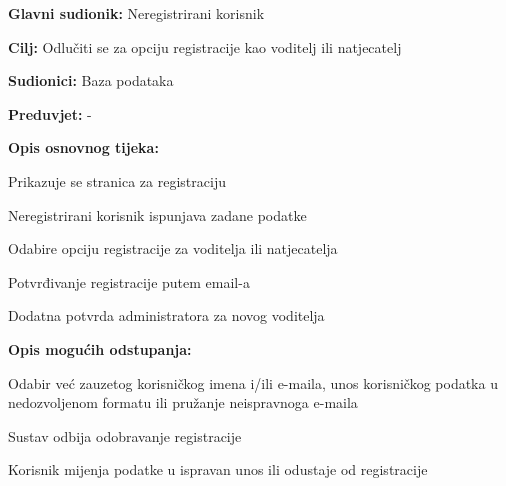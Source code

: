 					\noindent {}
					\begin{packed_item}
						
						\item \textbf{Glavni sudionik: }Neregistrirani korisnik
						\item  \textbf{Cilj:} Odlučiti se za opciju registracije kao voditelj ili natjecatelj 
						\item  \textbf{Sudionici:} Baza podataka
						\item  \textbf{Preduvjet:} -
						\item  \textbf{Opis osnovnog tijeka:}
						
						\item[] \begin{packed_enum}
							
							\item Prikazuje se stranica za registraciju
							\item Neregistrirani korisnik ispunjava zadane podatke
							\item Odabire opciju registracije za voditelja ili natjecatelja
							\item Potvrđivanje registracije putem email-a
							\item Dodatna potvrda administratora za novog voditelja
							
						\end{packed_enum}
						
						\item  \textbf{Opis mogućih odstupanja:}
						
						\item[] \begin{packed_item}
							
							\item[2.a] Odabir već zauzetog korisničkog imena i/ili e-maila, unos korisničkog podatka u nedozvoljenom formatu ili pružanje neispravnoga e-maila
							\item[] \begin{packed_enum}
								
								\item Sustav odbija odobravanje registracije
								\item Korisnik mijenja podatke u ispravan unos ili odustaje od registracije 
								
							\end{packed_enum}
						\end{packed_item}
					\end{packed_item}
					
